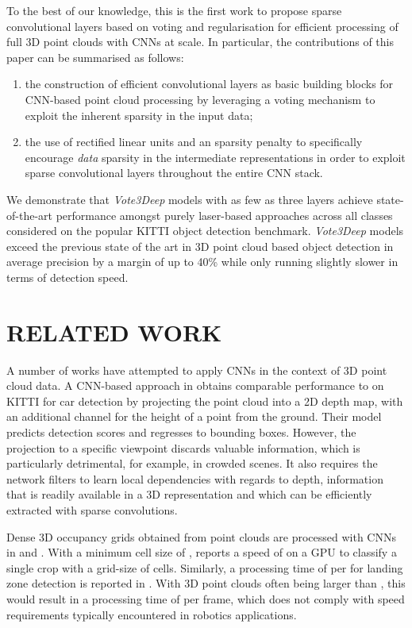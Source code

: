 \documentclass[letterpaper, 10 pt, conference]{tex_style/ieeeconf}
\begin{document}
To the best of our knowledge, this is the first work to propose sparse convolutional layers based on voting and  regularisation for efficient processing of full 3D point clouds with CNNs at scale.
In particular, the contributions of this paper can be summarised as follows:
\begin{enumerate}
\item the construction of efficient convolutional layers as basic building blocks for CNN-based point cloud processing by leveraging a voting mechanism to exploit the inherent sparsity in the input data;
\item the use of rectified linear units and an  sparsity penalty to specifically encourage \emph{data} sparsity in the intermediate representations in order to exploit sparse convolutional layers throughout the entire CNN stack.
\end{enumerate}

We demonstrate that \emph{Vote3Deep} models with as few as three layers achieve state-of-the-art performance amongst purely laser-based approaches across all classes considered on the popular KITTI object detection benchmark.
\emph{Vote3Deep} models exceed the previous state of the art in 3D point cloud based object detection in average precision by a margin of up to 40\% while only running slightly slower in terms of detection speed.

 \section{RELATED WORK}
\label{sec:related}

A number of works have attempted to apply CNNs in the context of 3D point cloud data.
A CNN-based approach in \cite{livehicle} obtains comparable performance to \cite{wang2015voting} on KITTI for car detection by projecting the point cloud into a 2D depth map, with an additional channel for the height of a point from the ground.
Their model predicts detection scores and regresses to bounding boxes.
However, the projection to a specific viewpoint discards valuable information, which is particularly detrimental, for example, in crowded scenes.
It also requires the network filters to learn local dependencies with regards to depth, information that is readily available in a 3D representation and which can be efficiently extracted with sparse convolutions.





Dense 3D occupancy grids obtained from point clouds are processed with CNNs in \cite{maturana2015voxnet} and \cite{maturana20153d}.
With a minimum cell size of , \cite{maturana2015voxnet} reports a speed of  on a GPU to classify a single crop with a grid-size of  cells.
Similarly, a processing time of  per  for landing zone detection is reported in \cite{maturana20153d}.
With 3D point clouds often being larger than , this would result in a processing time of  per frame, which does not comply with speed requirements typically encountered in robotics applications.
\end{document}
